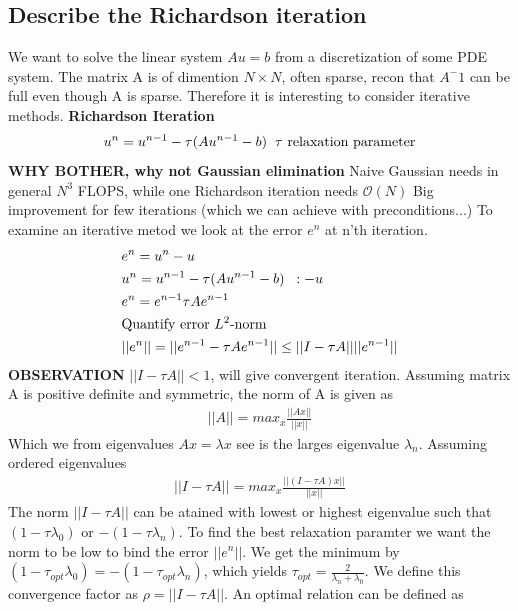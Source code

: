 \documentclass[a4paper,norsk]{article}
\begin{document}
\subsection*{Describe the Richardson iteration}
We want to solve the linear system $Au = b$ from a discretization of some PDE system. The matrix A is of dimention $N \times N$, often sparse, recon that
$A^-1$ can be full even though A is sparse. Therefore it is interesting to consider iterative methods.
\newline
\textbf{Richardson Iteration}
\begin{align*}
u^n = u^{n-1} - \tau(Au^{n-1} -b) \hspace{2mm} \tau\text{ relaxation parameter}
\end{align*}
\textbf{WHY BOTHER, why not Gaussian elimination} \newline
Naive Gaussian needs in general $N^3$ FLOPS, while one Richardson iteration needs $\mathcal{O}(N)$ 
Big improvement for few iterations (which we can achieve with preconditions...)\newline
To examine an iterative metod we look at the error $e^n$ at n'th iteration.
\begin{align*}
&e^n = u^n - u \\
&u^n = u^{n-1} - \tau (Au^{n-1} -b) \hspace{2mm} : -u \\
&e^n = e^{n-1} \tau A e^{n-1} \\
&\text{Quantify error $L^2$-norm} \\
&||e^n|| = ||e^{n-1} - \tau A e^{n-1}|| \leq ||I - \tau A || ||e^{n-1}|| 
\end{align*}
\textbf{OBSERVATION} $ ||I - \tau A || < 1$, will give convergent iteration.\newline
Assuming matrix A is positive definite and symmetric, the norm of A is given as 
\begin{align*}
||A|| = max_x \frac{||Ax||}{||x||}
\end{align*}
Which we from eigenvalues $Ax = \lambda x$ see is the larges eigenvalue $\lambda_n$. Assuming ordered eigenvalues
\begin{align*}
||I - \tau A || = max_x \frac{||(I - \tau A)x||}{||x||}
\end{align*}
The norm $||I - \tau A ||$ can be atained with lowest or highest eigenvalue such that $(1 - \tau \lambda_0)$ or $-(1 - \tau\lambda_n)$.
To find the best relaxation paramter we want the norm to be low to bind the error $||e^n||$. We get the minimum by
$(1 - \tau_{opt} \lambda_0) = -(1 - \tau_{opt}\lambda_n)$, which yields $\tau_{opt} = \frac{2}{\lambda_n + \lambda_0}$. 
We define this convergence factor as $\rho = ||I - \tau A ||$. An optimal relation can be defined as
\end{document}

